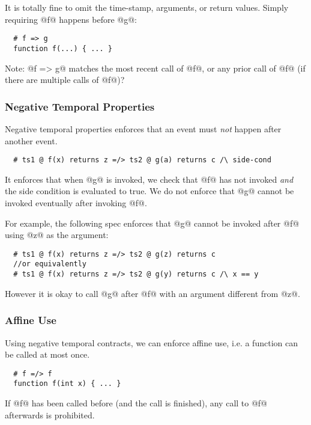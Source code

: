 \documentclass[acmsmall,review,anonymous]{acmart}\settopmatter{printfolios=true,printccs=false,printacmref=false}
\begin{document}
It is totally fine to omit the time-stamp, arguments, or return values.
Simply requiring @f@ happens before @g@:
\begin{lstlisting}
  # f => g
  function f(...) { ... }
\end{lstlisting}


Note: @f => g@ matches the most recent call of @f@,
or any prior call of @f@ (if there are multiple calls of @f@)?



\subsubsection{Negative Temporal Properties}

Negative temporal properties enforces that an event must \emph{not}
happen after another event.

\begin{lstlisting}
  # ts1 @ f(x) returns z =/> ts2 @ g(a) returns c /\ side-cond
\end{lstlisting}
It enforces that when @g@ is invoked, we check that @f@ has not invoked
\emph{and} the side condition is evaluated to true.
We do not enforce that @g@ cannot be invoked eventually
after invoking @f@.

For example, the following spec enforces that @g@ cannot be
invoked after @f@ using @z@ as the argument:
\begin{lstlisting}
  # ts1 @ f(x) returns z =/> ts2 @ g(z) returns c
  //or equivalently
  # ts1 @ f(x) returns z =/> ts2 @ g(y) returns c /\ x == y
\end{lstlisting}
However it is okay to call @g@ after @f@ with an argument different from @z@.

\subsubsection*{Affine Use}

Using negative temporal contracts, we can enforce affine use, i.e.
a function can be called at most once.
\begin{lstlisting}
  # f =/> f
  function f(int x) { ... }
\end{lstlisting}
If @f@ has been called before (and the call is finished), any
call to @f@ afterwards is prohibited.
\end{document}
